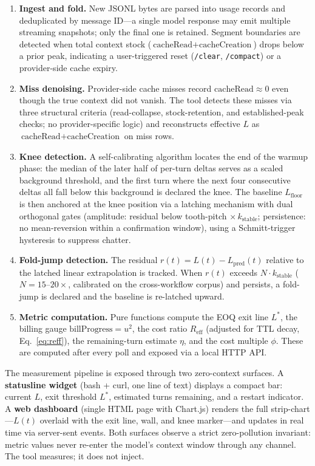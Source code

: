 \documentclass[11pt]{article}
\theoremstyle{definition}
\theoremstyle{remark}
\begin{document}
\begin{enumerate}[leftmargin=*,itemsep=0pt,topsep=0pt]
\item \textbf{Ingest and fold.} New JSONL bytes are parsed into usage records and deduplicated by message ID---a single model response may emit multiple streaming snapshots; only the final one is retained. Segment boundaries are detected when total context stock ($\text{cacheRead} + \text{cacheCreation}$) drops below a prior peak, indicating a user-triggered reset (\texttt{/clear}, \texttt{/compact}) or a provider-side cache expiry.
\item \textbf{Miss denoising.} Provider-side cache misses record $\text{cacheRead} \approx 0$ even though the true context did not vanish. The tool detects these misses via three structural criteria (read-collapse, stock-retention, and established-peak checks; no provider-specific logic) and reconstructs effective $L$ as $\text{cacheRead} + \text{cacheCreation}$ on miss rows.
\item \textbf{Knee detection.} A self-calibrating algorithm locates the end of the warmup phase: the median of the later half of per-turn deltas serves as a scaled background threshold, and the first turn where the next four consecutive deltas all fall below this background is declared the knee. The baseline $L_{\text{floor}}$ is then anchored at the knee position via a latching mechanism with dual orthogonal gates (amplitude: residual below tooth-pitch $\times\,k_{\text{stable}}$; persistence: no mean-reversion within a confirmation window), using a Schmitt-trigger hysteresis to suppress chatter.
\item \textbf{Fold-jump detection.} The residual $r(t) = L(t) - L_{\text{pred}}(t)$ relative to the latched linear extrapolation is tracked. When $r(t)$ exceeds $N \cdot k_{\text{stable}}$ ($N = 15$--$20\times$, calibrated on the cross-workflow corpus) and persists, a fold-jump is declared and the baseline is re-latched upward.
\item \textbf{Metric computation.} Pure functions compute the EOQ exit line $L^*$, the billing gauge $\text{billProgress} = u^2$, the cost ratio $R_{\text{eff}}$ (adjusted for TTL decay, Eq.~\ref{eq:reff}), the remaining-turn estimate $\eta$, and the cost multiple $\phi$. These are computed after every poll and exposed via a local HTTP API.
\end{enumerate}

The measurement pipeline is exposed through two zero-context surfaces. A \textbf{statusline widget} (bash + curl, one line of text) displays a compact bar: current $L$, exit threshold $L^*$, estimated turns remaining, and a restart indicator. A \textbf{web dashboard} (single HTML page with Chart.js) renders the full strip-chart---$L(t)$ overlaid with the exit line, wall, and knee marker---and updates in real time via server-sent events. Both surfaces observe a strict zero-pollution invariant: metric values never re-enter the model's context window through any channel. The tool measures; it does not inject.
\end{document}

